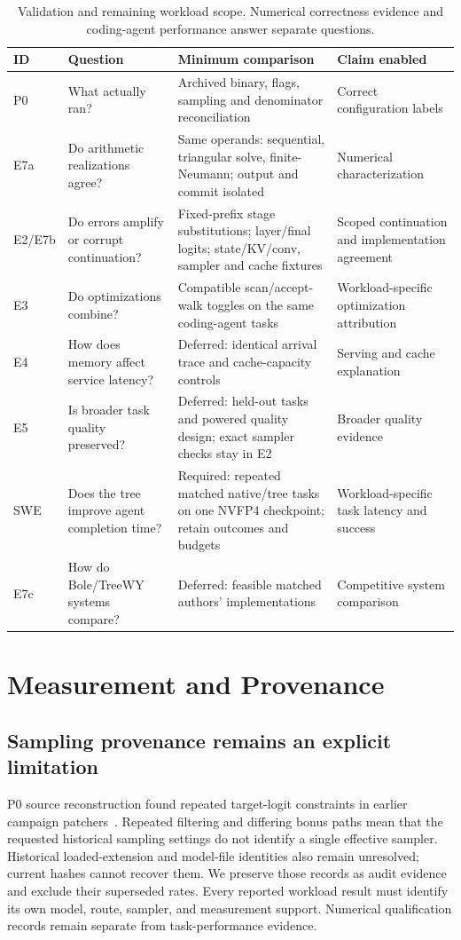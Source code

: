 \documentclass[conference]{IEEEtran}
\begin{document}
\appendices
\begin{table}[t]
\caption{Validation and remaining workload scope. Numerical correctness evidence and coding-agent performance answer separate questions.}
\label{tab:planned}
\centering\footnotesize
\begin{tabularx}{\textwidth}{@{}p{}p{}Y>{\raggedright\arraybackslash}p{0.20\textwidth}@{}}
\toprule
ID & Question & Minimum comparison & Claim enabled \\
\midrule
P0 & What actually ran? & Archived binary, flags, sampling and denominator reconciliation & Correct configuration labels \\
E7a & Do arithmetic realizations agree? & Same operands: sequential, triangular solve, finite-Neumann; output and commit isolated & Numerical characterization \\
E2/E7b & Do errors amplify or corrupt continuation? & Fixed-prefix stage substitutions; layer/final logits; state/KV/conv, sampler and cache fixtures & Scoped continuation and implementation agreement \\
E3 & Do optimizations combine? & Compatible scan/accept-walk toggles on the same coding-agent tasks & Workload-specific optimization attribution \\
E4 & How does memory affect service latency? & Deferred: identical arrival trace and cache-capacity controls & Serving and cache explanation \\
E5 & Is broader task quality preserved? & Deferred: held-out tasks and powered quality design; exact sampler checks stay in E2 & Broader quality evidence \\
SWE & Does the tree improve agent completion time? & Required: repeated matched native/tree tasks on one NVFP4 checkpoint; retain outcomes and budgets & Workload-specific task latency and success \\
E7c & How do Bole/TreeWY systems compare? & Deferred: feasible matched authors' implementations & Competitive system comparison \\
\bottomrule
\end{tabularx}
\end{table}
\section{Measurement and Provenance}
\label{app:audit}
\subsection{Sampling provenance remains an explicit limitation}
P0 source reconstruction found repeated target-logit constraints in earlier campaign patchers~\cite{lumo2026levers}. Repeated filtering and differing bonus paths mean that the requested historical sampling settings do not identify a single effective sampler. Historical loaded-extension and model-file identities also remain unresolved; current hashes cannot recover them. We preserve those records as audit evidence and exclude their superseded rates. Every reported workload result must identify its own model, route, sampler, and measurement support. Numerical qualification records remain separate from task-performance evidence.
\end{document}
